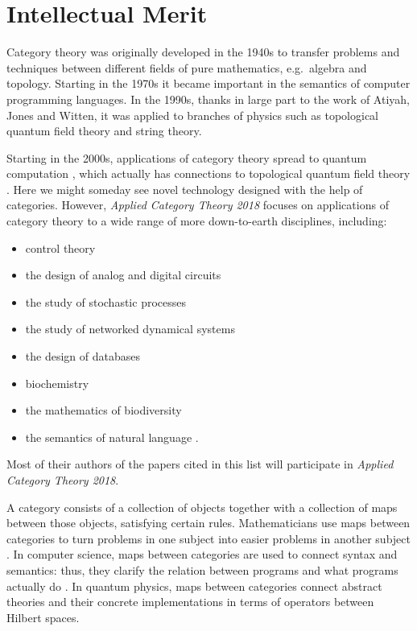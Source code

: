 \documentclass[12pt]{amsart}
\begin{document}
\section{Intellectual Merit}

Category theory was originally developed in the 1940s to transfer problems and techniques between different fields of pure mathematics, e.g.\ algebra and topology.  Starting in the 1970s it became important in the semantics of computer programming languages.    In the 1990s, thanks in large
part to the work of Atiyah, Jones and Witten, it was applied to branches of physics such as topological quantum field theory and string theory.  

Starting in the 2000s, applications of category theory spread to quantum computation \cite{abramsky09,selinger}, which actually has connections to topological quantum
field theory \cite{freedman}.    Here we might someday see novel technology designed with the
help of categories.  However, \textsl{Applied Category Theory 2018} focuses on applications  of category theory to a wide range of more down-to-earth disciplines, including:
\begin{itemize}
\item control theory \cite{arbib05,erbele,bonchi}
\item the design of analog and digital circuits \cite{baez15,ghica}
\item the study of stochastic processes \cite{albasini,baezfongpollard}
\item the study of networked dynamical systems \cite{spivak16,vagner} 
\item the design of databases \cite{spivak17,spivak14,spivak15}
\item biochemistry \cite{baezpollard,plotkin}
\item the mathematics of biodiversity \cite{cobbold,leinster}
\item the semantics of natural language \cite{sadrzadeh}. 
\end{itemize}
Most of their authors of the papers cited in this list will participate in \textsl{Applied Category Theory 2018}.  

A category consists of a collection of objects together with a collection of maps between those objects, satisfying certain rules.  Mathematicians use maps between categories to turn problems in one subject  into easier problems in another subject \cite{riehl}.  In computer science, maps between categories are used to connect syntax and semantics: thus, they clarify the relation between programs and what programs actually do \cite{crole,pierce}.  In quantum physics, maps between categories connect abstract theories and their concrete implementations in terms of operators between Hilbert spaces.
\end{document}
